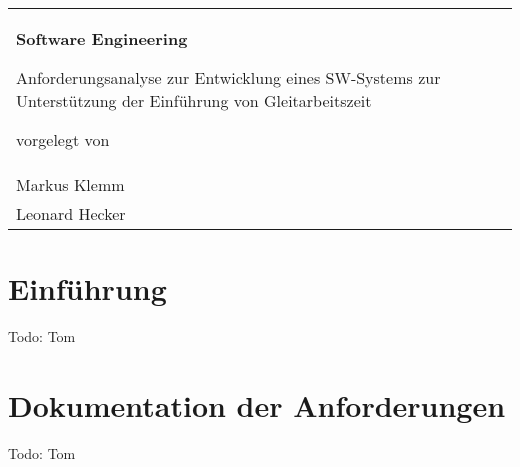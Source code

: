 


\frontmatter

\begin{titlepage}
	\begin{tabularx}{\linewidth}{X}		
 		\\ \\ \hline	
 		 			
		\vspace{3em}
		
  		\begin{singlespace}
  			\begin{center}    \Large	\bfseries 
  			Software Engineering 
  			\end{center}
  		\end{singlespace}
  		
  		\vspace{2em}
  		
  		\begin{singlespace}
  			\begin{center}
   				Anforderungsanalyse zur Entwicklung 
				eines SW-Systems zur Unterstützung 
				der Einführung von Gleitarbeitszeit
  			\end{center}
  		\end{singlespace} \medskip
  		\begin{center}
  			vorgelegt von
  		\end{center}  		
  		\begin{center}
  			\large{Tom Graupner} \\
			Markus Klemm \\
			Leonard Hecker 
  		\end{center}\medskip

 	\end{tabularx}
\end{titlepage}


\tableofcontents

\mainmatter

\chapter{Einführung}
Todo: Tom
\chapter{Dokumentation der Anforderungen}
Todo: Tom
